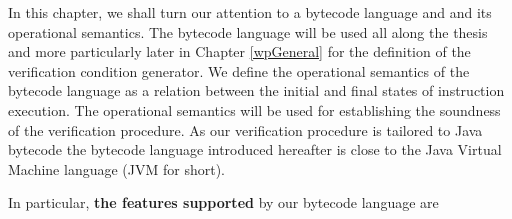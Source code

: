 

In this chapter, we  shall turn our attention to a bytecode language and  
  and its operational semantics. The bytecode  language will be used all along the thesis and more particularly
  later in Chapter \ref{wpGeneral} for the definition of the verification condition generator.
 We define the operational semantics of  the bytecode language   as a relation between the initial and final states of 
 instruction execution.
 The operational semantics will be used 
 for establishing  the soundness of the verification procedure.
 As our verification procedure is tailored to Java bytecode 
 the bytecode language introduced hereafter is close to the 
 Java Virtual Machine  language \cite{VMSpec}(JVM for short). 
 
In particular, \textbf{the features supported} by our bytecode language are 
